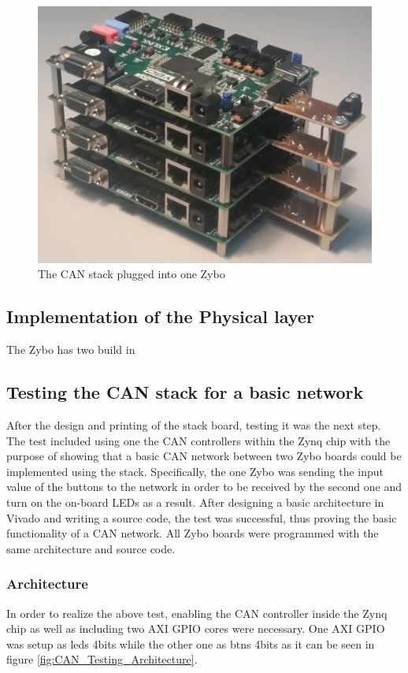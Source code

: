 \begin{figure}[H]
	\centering
	\includegraphics[width = 0.9\linewidth]{graphics/CAN_stack_picture}
	\caption{The CAN stack plugged into one Zybo}
	\label{fig:CAN_stack_picture}
\end{figure}

\subsection{Implementation of the Physical layer}\label{sub:CANphys_implementation}
The Zybo has two build in

\subsection{Testing the CAN stack for a basic network}
After the design and printing of the stack board, testing it was the next step.
The test included using one the CAN controllers within the Zynq chip with the purpose of showing that a basic CAN network between two Zybo boards could be implemented using the stack.
Specifically, the one Zybo was sending the input value of the buttons to the network in order to be received by the second one and turn on the on-board LEDs as a result.
After designing a basic architecture in Vivado and writing a source code, the test was successful, thus proving the basic functionality of a CAN network.
All Zybo boards were programmed with the same architecture and source code.

\subsubsection{Architecture}
In order to realize the above test, enabling the CAN controller inside the Zynq chip as well as including two AXI GPIO cores were necessary. One AXI GPIO was setup as leds 4bits while the other one as btns 4bits as it can be seen in figure \ref{fig:CAN_Testing_Architecture}. 

